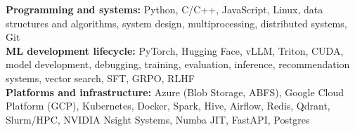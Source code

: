 \documentclass[10pt,letterpaper]{article}
\begin{document}
\textbf{Programming and systems:} Python, C/C++, JavaScript, Linux, data structures and algorithms, system design, \mbox{multiprocessing}, distributed systems, Git\\
\textbf{ML development lifecycle:} PyTorch, Hugging Face, vLLM, Triton, CUDA, model development, debugging, training, evaluation, inference, recommendation systems, vector search, SFT, GRPO, RLHF\\
\textbf{Platforms and infrastructure:} Azure (Blob Storage, ABFS), Google Cloud Platform (GCP), Kubernetes, Docker, Spark, Hive, Airflow, Redis, Qdrant, Slurm/HPC, NVIDIA Nsight Systems, Numba JIT, FastAPI, Postgres
\end{document}
